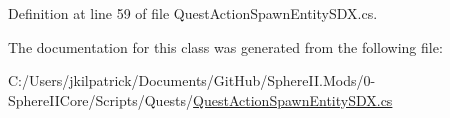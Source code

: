 Definition at line 59 of file Quest\+Action\+Spawn\+Entity\+S\+D\+X.\+cs.



The documentation for this class was generated from the following file\+:\begin{DoxyCompactItemize}
\item 
C\+:/\+Users/jkilpatrick/\+Documents/\+Git\+Hub/\+Sphere\+I\+I.\+Mods/0-\/\+Sphere\+I\+I\+Core/\+Scripts/\+Quests/\mbox{\hyperlink{_quest_action_spawn_entity_s_d_x_8cs}{Quest\+Action\+Spawn\+Entity\+S\+D\+X.\+cs}}\end{DoxyCompactItemize}
